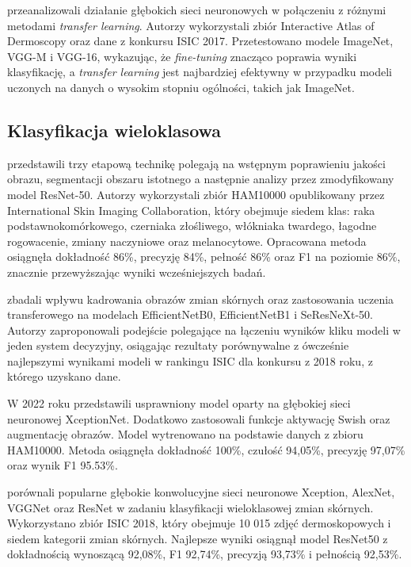 \citet{Menegola_Fornaciali_Pires_Bittencourt_Avila_Valle_2017} przeanalizowali działanie głębokich sieci neuronowych w połączeniu z różnymi metodami \textit{transfer learning}.
Autorzy wykorzystali zbiór Interactive Atlas of Dermoscopy oraz dane z konkursu ISIC 2017.
Przetestowano modele ImageNet, VGG-M i VGG-16, wykazując, że \textit{fine-tuning} znacząco poprawia wyniki klasyfikację, a \textit{transfer learning} jest najbardziej efektywny w przypadku modeli uczonych na danych o wysokim stopniu ogólności, takich jak ImageNet.

\subsection{Klasyfikacja wieloklasowa}
\citet{Alwakid_Gouda_Humayun_Sama_2022} przedstawili trzy etapową technikę polegają na wstępnym poprawieniu jakości obrazu, segmentacji obszaru istotnego a następnie analizy przez zmodyfikowany model ResNet-50.
Autorzy wykorzystali zbiór HAM10000 opublikowany przez International Skin Imaging Collaboration, który obejmuje siedem klas: raka podstawnokomórkowego, czerniaka złośliwego, włókniaka twardego, łagodne rogowacenie, zmiany naczyniowe oraz melanocytowe.
Opracowana metoda osiągnęła dokładność 86\%, precyzję 84\%, pełność 86\% oraz F1 na poziomie 86\%, znacznie przewyższając wyniki wcześniejszych badań.

\citet{Mahbod_Schaefer_Wang_Dorffner_Ecker_Ellinger_2020} zbadali wpływu kadrowania obrazów zmian skórnych oraz zastosowania uczenia transferowego na modelach EfficientNetB0, EfficientNetB1 i SeResNeXt-50.
Autorzy zaproponowali podejście polegające na łączeniu wyników kliku modeli w jeden system decyzyjny, osiągając rezultaty porównywalne z ówcześnie najlepszymi wynikami modeli w rankingu ISIC dla konkursu z 2018 roku, z którego uzyskano dane.

W 2022 roku \citet{Lu_Firoozeh_Abolhasani_Zadeh_2022} przedstawili usprawniony model oparty na głębokiej sieci neuronowej XceptionNet.
Dodatkowo zastosowali funkcje aktywację Swish oraz augmentację obrazów.
Model wytrenowano na podstawie danych z zbioru HAM10000.
Metoda osiągnęła dokładność 100\%, czułość 94,05\%, precyzję 97,07\% oraz wynik F1 95.53\%.

\citet{Kassani_2019} porównali popularne głębokie konwolucyjne sieci neuronowe Xception, AlexNet, VGGNet oraz ResNet w zadaniu klasyfikacji wieloklasowej zmian skórnych.
Wykorzystano zbiór ISIC 2018, który obejmuje 10 015 zdjęć dermoskopowych i siedem kategorii zmian skórnych.
Najlepsze wyniki osiągnął model ResNet50 z dokładnością wynoszącą 92,08\%, F1 92,74\%, precyzją 93,73\% i pełnością 92,53\%.

